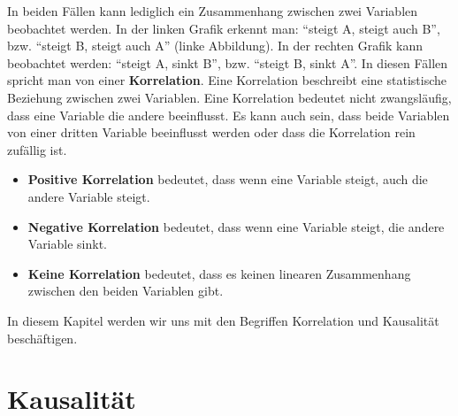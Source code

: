 In beiden Fällen kann lediglich ein Zusammenhang zwischen zwei Variablen beobachtet werden. In der linken Grafik erkennt man: \enquote{steigt A, steigt auch B}, bzw. \enquote{steigt B, steigt auch A} (linke Abbildung). In der rechten Grafik kann beobachtet werden: \enquote{steigt A, sinkt B}, bzw. \enquote{steigt B, sinkt  A}. In diesen Fällen spricht man von einer \textbf{Korrelation}. Eine Korrelation beschreibt eine statistische Beziehung zwischen zwei Variablen. Eine Korrelation bedeutet nicht zwangsläufig, dass eine Variable die andere beeinflusst. Es kann auch sein, dass beide Variablen von einer dritten Variable beeinflusst werden oder dass die Korrelation rein zufällig ist.
\begin{itemize}
	\item \textbf{Positive Korrelation} bedeutet, dass wenn eine Variable steigt, auch die andere Variable steigt.
	\item \textbf{Negative Korrelation} bedeutet, dass wenn eine Variable steigt, die andere Variable sinkt.
	\item \textbf{Keine Korrelation} bedeutet, dass es keinen linearen Zusammenhang zwischen den beiden Variablen gibt.
\end{itemize}

In diesem Kapitel werden wir uns mit den Begriffen Korrelation und Kausalität beschäftigen.

\section{Kausalität}

